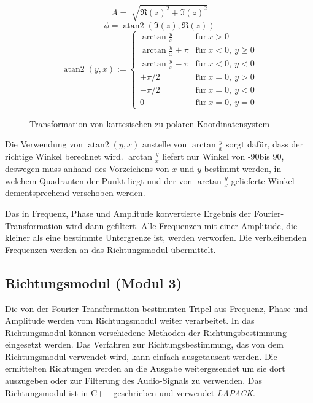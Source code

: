 \begin{minipage}{0.49\textwidth}
  $$
  A = \sqrt[]{{\Re(z)}^2 + {\Im(z)}^2}
  $$
  $$
  \phi = \operatorname{atan2}(\Im(z), \Re(z))
  $$
  $$
  \operatorname{atan2}(y,x) := \begin{cases} \arctan\frac{y}{x} & \mathrm{f\ddot ur}\ x > 0\\ \arctan\frac{y}{x} + \pi & \mathrm{f\ddot ur}\ x < 0,\ y \geq 0\\ \arctan\frac{y}{x} - \pi & \mathrm{f\ddot ur}\ x < 0,\ y < 0\\ +\pi/2 & \mathrm{f\ddot ur}\ x = 0,\ y > 0\\ -\pi/2 & \mathrm{f\ddot ur}\ x = 0,\ y < 0\\ 0 & \mathrm{f\ddot ur}\ x = 0,\ y = 0 \end{cases}
  $$
\end{minipage}
\begin{minipage}{0.49\textwidth}
  \begin{figure}[H]
    \centering
    \scalebox{.6}{}
    \caption{Transformation von kartesischen zu polaren Koordinatensystem}
    \label{fig:polarconvert}
  \end{figure}
\end{minipage}
Die Verwendung von $\operatorname{atan2}(y,x)$ anstelle von $\arctan\frac{y}{x}$ sorgt dafür, dass der richtige Winkel berechnet wird. $\arctan\frac{y}{x}$ liefert nur Winkel von -90\degree bis 90\degree, deswegen muss anhand des Vorzeichens von $x$ und $y$ bestimmt werden, in welchem Quadranten der Punkt liegt und der von $\arctan\frac{y}{x}$ gelieferte Winkel dementsprechend verschoben werden.

Das in Frequenz, Phase und Amplitude konvertierte Ergebnis der Fourier-Transformation wird dann gefiltert. Alle Frequenzen mit einer Amplitude, die kleiner als eine bestimmte Untergrenze ist, werden verworfen. Die verbleibenden Frequenzen werden an das Richtungsmodul übermittelt.

\subsection{Richtungsmodul (Modul 3)}
Die von der Fourier-Transformation bestimmten Tripel aus Frequenz, Phase und Amplitude werden vom Richtungsmodul weiter verarbeitet. In das Richtungsmodul können verschiedene Methoden der Richtungsbestimmung eingesetzt werden. Das Verfahren zur Richtungsbestimmung, das von dem Richtungsmodul verwendet wird, kann einfach ausgetauscht werden. Die ermittelten Richtungen werden an die Ausgabe weitergesendet um sie dort auszugeben oder zur Filterung des Audio-Signals zu verwenden.
Das Richtungsmodul ist in C++ geschrieben und verwendet \textit{LAPACK}\cite{Anderson:1990:LPL:110382.110385}.
